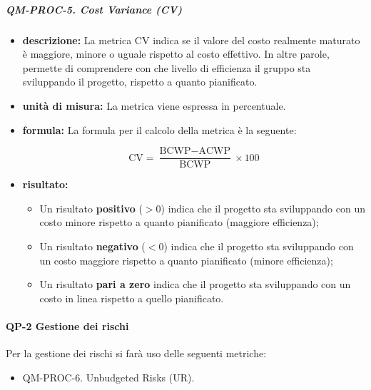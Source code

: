 			\subparagraph{QM-PROC-5. Cost Variance (CV)}
			\begin{itemize}
				\item \textbf{descrizione: }
				La metrica CV indica se il valore del costo realmente maturato è maggiore, minore o uguale rispetto al costo effettivo. In altre parole, permette di comprendere con che livello di efficienza il gruppo sta sviluppando il progetto, rispetto a quanto pianificato.

				\item \textbf{unità di misura: }
				La metrica viene espressa in percentuale.

				\item \textbf{formula: }
				La formula per il calcolo della metrica è la seguente:

				\[
					\text{CV} = \frac{\text{BCWP} - \text{ACWP}}{\text{BCWP}} \times 100
				\]

				\item \textbf{risultato: }
				\begin{itemize}
					\item Un risultato \textbf{positivo} (\(> 0\)) indica che il progetto sta sviluppando con un costo minore rispetto a quanto pianificato (maggiore efficienza);
					\item Un risultato \textbf{negativo} (\(< 0\)) indica che il progetto sta sviluppando con un costo maggiore rispetto a quanto pianificato (minore efficienza);
					\item Un risultato \textbf{pari a zero} indica che il progetto sta sviluppando con un costo in linea rispetto a quello pianificato.
				\end{itemize}
			\end{itemize}
		\paragraph{QP-2 Gestione dei rischi}

			Per la gestione dei rischi si farà uso delle seguenti metriche:

			\begin{itemize}
				\item QM-PROC-6. Unbudgeted Risks (UR).
			\end{itemize}


